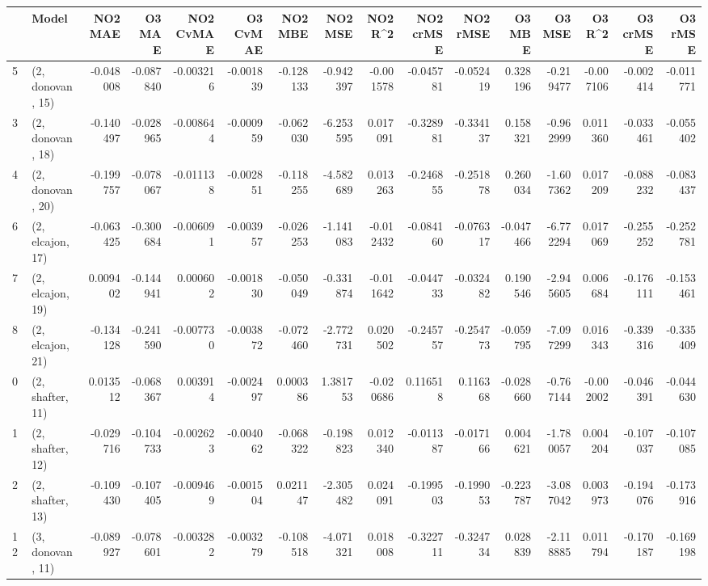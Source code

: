 \begin{tabular}{llrrrrrrrrrrrrrr}
\toprule
{} &             Model &   NO2 MAE &    O3 MAE &  NO2 CvMAE &  O3 CvMAE &   NO2 MBE &    NO2 MSE &   NO2 R\textasciicircum2 &  NO2 crMSE &  NO2 rMSE &    O3 MBE &     O3 MSE &    O3 R\textasciicircum2 &  O3 crMSE &   O3 rMSE \\
\midrule
5  &  (2, donovan, 15) & -0.048008 & -0.087840 &  -0.003216 & -0.001839 & -0.128133 &  -0.942397 & -0.001578 &  -0.045781 & -0.052419 &  0.328196 &  -0.219477 & -0.007106 & -0.002414 & -0.011771 \\
3  &  (2, donovan, 18) & -0.140497 & -0.028965 &  -0.008644 & -0.000959 & -0.062030 &  -6.253595 &  0.017091 &  -0.328981 & -0.334137 &  0.158321 &  -0.962999 &  0.011360 & -0.033461 & -0.055402 \\
4  &  (2, donovan, 20) & -0.199757 & -0.078067 &  -0.011138 & -0.002851 & -0.118255 &  -4.582689 &  0.013263 &  -0.246855 & -0.251878 &  0.260034 &  -1.607362 &  0.017209 & -0.088232 & -0.083437 \\
6  &  (2, elcajon, 17) & -0.063425 & -0.300684 &  -0.006091 & -0.003957 & -0.026253 &  -1.141083 & -0.012432 &  -0.084160 & -0.076317 & -0.047466 &  -6.772294 &  0.017069 & -0.255252 & -0.252781 \\
7  &  (2, elcajon, 19) &  0.009402 & -0.144941 &   0.000602 & -0.001830 & -0.050049 &  -0.331874 & -0.011642 &  -0.044733 & -0.032482 &  0.190546 &  -2.945605 &  0.006684 & -0.176111 & -0.153461 \\
8  &  (2, elcajon, 21) & -0.134128 & -0.241590 &  -0.007730 & -0.003872 & -0.072460 &  -2.772731 &  0.020502 &  -0.245757 & -0.254773 & -0.059795 &  -7.097299 &  0.016343 & -0.339316 & -0.335409 \\
0  &  (2, shafter, 11) &  0.013512 & -0.068367 &   0.003914 & -0.002497 &  0.000386 &   1.381753 & -0.020686 &   0.116518 &  0.116368 & -0.028660 &  -0.767144 & -0.002002 & -0.046391 & -0.044630 \\
1  &  (2, shafter, 12) & -0.029716 & -0.104733 &  -0.002623 & -0.004062 & -0.068322 &  -0.198823 &  0.012340 &  -0.011387 & -0.017166 &  0.004621 &  -1.780057 &  0.004204 & -0.107037 & -0.107085 \\
2  &  (2, shafter, 13) & -0.109430 & -0.107405 &  -0.009469 & -0.001504 &  0.021147 &  -2.305482 &  0.024091 &  -0.199503 & -0.199053 & -0.223787 &  -3.087042 &  0.003973 & -0.194076 & -0.173916 \\
12 &  (3, donovan, 11) & -0.089927 & -0.078601 &  -0.003282 & -0.003279 & -0.108518 &  -4.071321 &  0.018008 &  -0.322711 & -0.324734 &  0.028839 &  -2.118885 &  0.011794 & -0.170187 & -0.169198 \\

\end{tabular}
